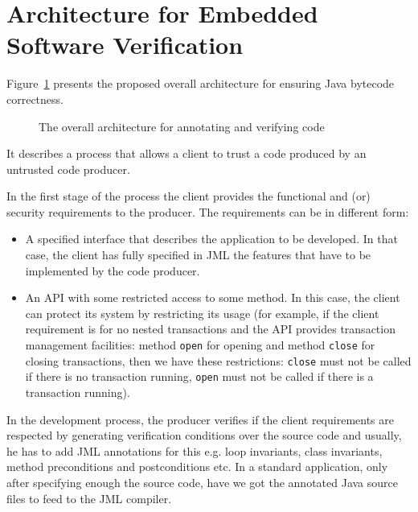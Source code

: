 \section{Architecture for Embedded Software Verification}
\label{architecture_s}	
Figure~\ref{architecture} presents the proposed overall architecture for ensuring Java bytecode correctness. 
\begin{figure}[ht!]
\begin{center}
\caption{The overall architecture for annotating and verifying code}
\label{architecture}
\end{center}
\end{figure}
It describes a process that allows a client to trust a code produced by an untrusted code producer.

In the first stage of the process the client provides the functional and (or) security requirements to the producer. The requirements can be in different form:
\begin{itemize}
\item A specified interface that describes the application to be developed. In that case, the client has fully specified in JML the features that have to be implemented by the code producer.
\item An API with some restricted access to some method. In this case, the client can protect its system by restricting its usage (for example, if the client requirement is for no nested transactions and the API provides transaction management facilities: method \texttt{open} for opening and method \texttt{close} for closing transactions, then we have these restrictions: \texttt{close} must not be called if there is no transaction running, \texttt{open} must not be called if there is a transaction running).   
\end{itemize}

In the development process, the producer verifies if the client requirements are respected by generating verification conditions
over the source code and usually, he has to add JML annotations for this e.g. loop invariants, class invariants, method preconditions
 and postconditions etc. In a standard application, only after specifying enough the source code, 
have we got the annotated Java source files to feed to the JML compiler.


